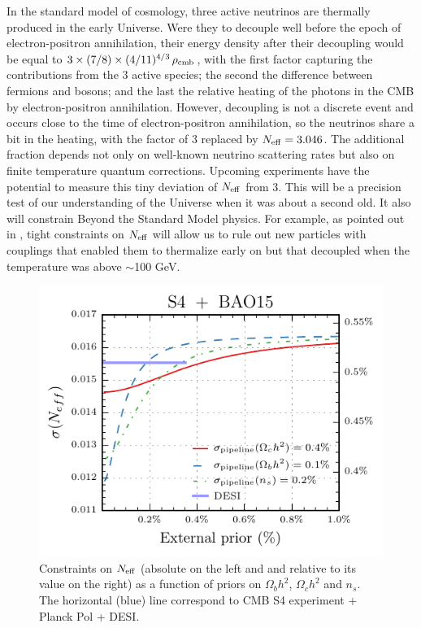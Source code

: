\documentclass[aps,prd,reprint,superscriptaddress,nofootinbib,floatfix]{revtex4-1}
\begin{document}
In the standard model of cosmology, three active neutrinos are thermally produced in the early Universe. Were they to decouple well before the epoch of electron-positron annihilation, their energy density after their decoupling would be equal to $3\times (7/8)\times (4/11)^{4/3}\,\rho_{\rm cmb}$, with the first factor capturing the contributions from the 3 active species; the second the difference between fermions and bosons; and the last the relative heating of the photons in the CMB by electron-positron annihilation. However, decoupling is not a discrete event and occurs close to the time of electron-positron annihilation, so the neutrinos share a bit in the heating, with the factor of 3 replaced by $N_{\rm eff}=3.046$. The additional fraction depends not only on well-known neutrino scattering rates but also on finite temperature quantum corrections. 
Upcoming experiments have the potential to measure this tiny deviation of $N_{\rm eff}$ from 3. This will be a precision test of our understanding of the Universe when it was about a second old. It also will constrain Beyond the Standard Model physics. For example, as pointed out in \cite{baumann:2015}, tight constraints on $N_{\rm eff}$ will allow us to rule out new particles with couplings that enabled them to thermalize early on but that decoupled when the temperature was above $\sim$100 GeV.






\begin{figure}[htbp]
\begin{center}
\includegraphics{prior_massless_neutrinos}
\caption{Constraints on $N_{\rm{eff}}$ (absolute on the left and and relative to its value on the right) as a function of priors on $\Omega _{b} h^{2}$, $\Omega _{c} h^{2}$ and $n_{s}$. The horizontal (blue) line correspond to CMB S4 experiment + Planck Pol + DESI.}
\label{fig:prior_neff}
\end{center}
\end{figure}
\end{document}
